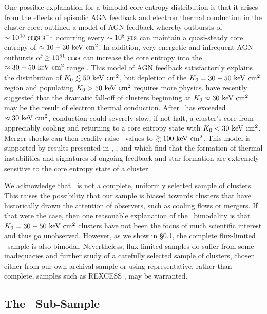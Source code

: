 \documentclass[12pt,preprint]{aastex}
\begin{document}
One possible explanation for a bimodal core entropy distribution is
that it arises from the effects of episodic AGN feedback and electron
thermal conduction in the cluster core. \citet{agnframework} outlined
a model of AGN feedback whereby outbursts of $\sim 10^{45} \mathrm{\mbox{\ensuremath{\mathrm{~ergs}}} \mathrm{\mbox{\ensuremath{\mathrm{~s}}}^{-1}}}$
occurring every $\sim 10^8 \mbox{\ensuremath{\mathrm{~yrs}}}$ can maintain a quasi-steady core
entropy of $\approx 10-30 \mathrm{\mbox{\ensuremath{\mathrm{~keV}}} \mathrm{\mbox{\ensuremath{\mathrm{~cm}}}^2}}$. In addition, very energetic and
infrequent AGN outbursts of $\geq 10^{61} \mbox{\ensuremath{\mathrm{~ergs}}}$ can increase the core
entropy into the $\approx 30-50 \mathrm{\mbox{\ensuremath{\mathrm{~keV}}} \mathrm{\mbox{\ensuremath{\mathrm{~cm}}}^2}}$ range \citep{agnframework}. This
model of AGN feedback satisfactorily explains the distribution of
$K_0 \lesssim 50 \mathrm{\mbox{\ensuremath{\mathrm{~keV}}} \mathrm{\mbox{\ensuremath{\mathrm{~cm}}}^2}}$, but depletion of the $K_0 = 30-50 \mathrm{\mbox{\ensuremath{\mathrm{~keV}}} \mathrm{\mbox{\ensuremath{\mathrm{~cm}}}^2}}$
region and populating $K_0 > 50 \mathrm{\mbox{\ensuremath{\mathrm{~keV}}} \mathrm{\mbox{\ensuremath{\mathrm{~cm}}}^2}}$ requires more
physics. \citet{conduction} have recently suggested that the dramatic
fall-off of clusters beginning at $K_0 \approx 30 \mathrm{\mbox{\ensuremath{\mathrm{~keV}}} \mathrm{\mbox{\ensuremath{\mathrm{~cm}}}^2}}$ may be the
result of electron thermal conduction. After \kna\ has exceeded
$\approx 30 \mathrm{\mbox{\ensuremath{\mathrm{~keV}}} \mathrm{\mbox{\ensuremath{\mathrm{~cm}}}^2}}$, conduction could severely slow, if not halt, a
cluster's core from appreciably cooling and returning to a core
entropy state with $K_0 < 30 \mathrm{\mbox{\ensuremath{\mathrm{~keV}}} \mathrm{\mbox{\ensuremath{\mathrm{~cm}}}^2}}$. Merger shocks can then readily
raise \kna\ values to $\gtrsim 100 \mathrm{\mbox{\ensuremath{\mathrm{~keV}}} \mathrm{\mbox{\ensuremath{\mathrm{~cm}}}^2}}$. This model is supported by
results presented in \citet{haradent}, \citet{2008arXiv0804.3823G},
and \citet{2008arXiv0802.1864R} which find that the formation of
thermal instabilities and signatures of ongoing feedback and star
formation are extremely sensitive to the core entropy state of a
cluster.

We acknowledge that \accept\ is not a complete, uniformly selected
sample of clusters. This raises the possibility that our sample is
biased towards clusters that have historically drawn the attention of
observers, such as cooling flows or mergers. If that were the case,
then one reasonable explanation of the \kna\ bimodality is that $K_0
= 30-50 \mathrm{\mbox{\ensuremath{\mathrm{~keV}}} \mathrm{\mbox{\ensuremath{\mathrm{~cm}}}^2}}$ clusters have not been the focus of much scientific
interest and thus go unobserved. However, as we show in
\S\ref{sec:hifl}, the complete flux-limited \hifl\ sample is also
bimodal. Nevertheless, flux-limited samples do suffer from some
inadequacies and further study of a carefully selected sample of
clusters, chosen either from our own archival sample or using
representative, rather than complete, samples such as REXCESS
\citep{rexcess}, may be warranted.

\subsection{The \hifl\ Sub-Sample}
\label{sec:hifl}
\end{document}
